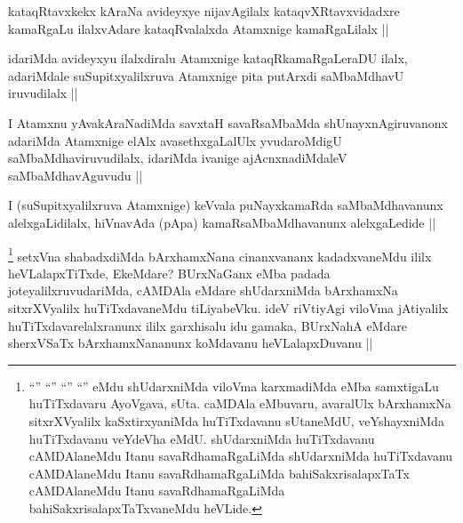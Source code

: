 
\begin{artha}
kataqRtavxkekx kAraNa avideyxye nijavAgilalx kataqvXRtavxvidadxre kamaRgaLu ilalxvAdare kataqRvalalxda Atamxnige kamaRgaLilalx ||
\end{artha}

\begin{artha}
idariMda avideyxyu ilalxdiralu Atamxnige kataqRkamaRgaLeraDU ilalx, adariMdale suSupitxyalilxruva Atamxnige pita putArxdi saMbaMdhavU iruvudilalx ||
\end{artha}


\begin{artha}
I Atamxnu yAvakAraNadiMda savxtaH savaRsaMbaMda shUnayxnAgiruvanonx adariMda Atamxnige elAlx avasethxgaLalUlx yvudaroMdigU saMbaMdhaviruvudilalx, idariMda ivanige ajAcnxnadiMdaleV saMbaMdhavAguvudu ||
\end{artha}


\begin{artha}
I (suSupitxyalilxruva Atamxnige) keVvala puNayxkamaRda saMbaMdhavanunx alelxgaLidilalx, hiVnavAda (pApa) kamaRsaMbaMdhavanunx alelxgaLedide ||
\end{artha}


\begin{artha}
\footnote{``\stext'' ``\stext'' ``\stext'' ``\stext'' eMdu shUdarxniMda viloVma karxmadiMda eMba samxtigaLu huTiTxdavaru AyoVgava, sUta. caMDAla eMbuvaru, avaralUlx bArxhamxNa sitxrXVyalilx kaSxtirxyaniMda huTiTxdavanu sUtaneMdU, veYshayxniMda huTiTxdavanu veYdeVha eMdU. shUdarxniMda huTiTxdavanu cAMDAlaneMdu Itanu savaRdhamaRgaLiMda shUdarxniMda huTiTxdavanu cAMDAlaneMdu Itanu savaRdhamaRgaLiMda bahiSakxrisalapxTaTx cAMDAlaneMdu Itanu savaRdhamaRgaLiMda bahiSakxrisalapxTaTxvaneMdu heVLide.}
setxVna shabadxdiMda bArxhamxNana cinanxvananx kadadxvaneMdu ililx heVLalapxTiTxde, EkeMdare? BUrxNaGanx eMba padada joteyalilxruvudariMda, cAMDAla eMdare shUdarxniMda bArxhamxNa sitxrXVyalilx huTiTxdavaneMdu tiLiyabeVku. ideV riVtiyAgi viloVma jAtiyalilx huTiTxdavarelalxranunx ililx garxhisalu idu gamaka, BUrxNahA eMdare sherxVSaTx bArxhamxNananunx koMdavanu heVLalapxDuvanu ||
\end{artha}

